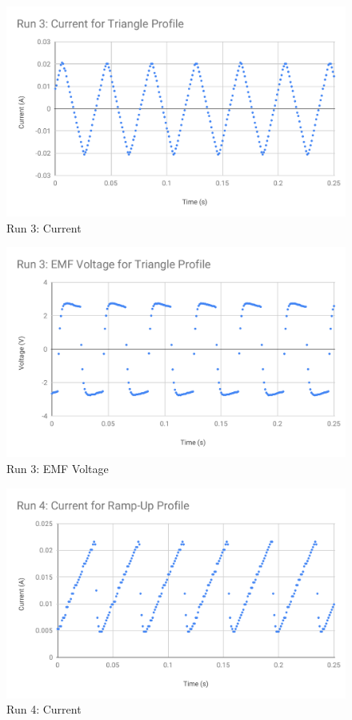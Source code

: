 \begin{figure}[ht]
	\centering
	\includegraphics[scale=0.74]{image/04-faraday/run-3-I.pdf}
	\caption{Run 3: Current}
	\label{figure.04.run.3.I}
\end{figure}
\begin{figure}[ht]
	\centering
	\includegraphics[scale=0.74]{image/04-faraday/run-3-V.pdf}
	\caption{Run 3: EMF Voltage}
	\label{figure.04.run.3.V}
\end{figure}
\begin{figure}[ht]
	\centering
	\includegraphics[scale=0.74]{image/04-faraday/run-4-I.pdf}
	\caption{Run 4: Current}
	\label{figure.04.run.4.I}
\end{figure}
